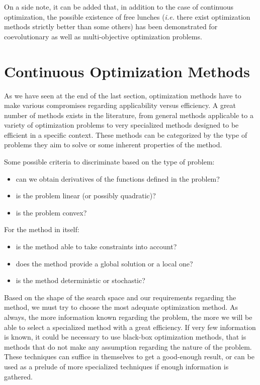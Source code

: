 On a side note, it can be added that, in addition to the case of continuous optimization, the possible existence of free lunches (\emph{i.e.} there exist optimization methods strictly better than some others) has been demonstrated for coevolutionary \cite{1545946} as well as multi-objective \cite{1299403} optimization problems.

\section{Continuous Optimization Methods}

As we have seen at the end of the last section, optimization methods have to make various compromises regarding applicability versus efficiency. A great number of methods exists in the literature, from general methods applicable to a variety of optimization problems to very specialized methods designed to be efficient in a specific context. These methods can be categorized by the type of problems they aim to solve or some inherent properties of the method.

Some possible criteria to discriminate based on the type of problem:
\begin{itemize}
\item can we obtain derivatives of the functions defined in the problem?
\item is the problem linear (or possibly quadratic)?
\item is the problem convex?
\end{itemize}

For the method in itself:
\begin{itemize}
\item is the method able to take constraints into account?
\item does the method provide a global solution or a local one?
\item is the method deterministic or stochastic?
\end{itemize}

Based on the shape of the search space and our requirements regarding the method, we must try to choose the most adequate optimization method. As always, the more information known regarding the problem, the more we will be able to select a specialized method with a great efficiency. If very few information is known, it could be necessary to use black-box optimization methods, that is methods that do not make any assumption regarding the nature of the problem. These techniques can suffice in themselves to get a good-enough result, or can be used as a prelude of more specialized techniques if enough information is gathered.

